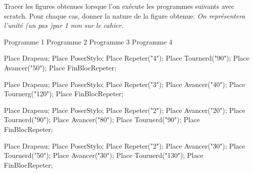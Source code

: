 \begin{Maquette}[Fiche,CorrigeFin,Colonnes=2]{}
   
   \begin{exercice}[Dur] %
      Tracer les figures obtenues lorsque l'on exécute les programmes suivants avec scratch. Pour chaque cas, donner la nature de la figure obtenue. {\it On représentera l'unité (un pas )par 1 mm sur le cahier.} \par \smallskip
      \small Programme 1 \hspace*{2.05cm} Programme 2 \hspace*{2.05cm} Programme 3 \hspace*{2.05cm} Programme 4 \par \smallskip
      \begin{Scratch}[Echelle=0.75]
         Place Drapeau;
         Place PoserStylo;
         Place Repeter("4");
            Place Tournerd("90");
            Place Avancer("50");
         Place FinBlocRepeter;
      \end{Scratch}
      \quad
      \begin{Scratch}[Echelle=0.75]
         Place Drapeau;
         Place PoserStylo;
         Place Repeter("3");
            Place Avancer("40");
            Place Tournerg("120");
         Place FinBlocRepeter;
      \end{Scratch}
      \quad
      \begin{Scratch}[Echelle=0.75]
         Place Drapeau;
         Place PoserStylo;
         Place Repeter("2");
            Place Avancer("20");
            Place Tournerd("90");
            Place Avancer("80");
            Place Tournerd("90");
         Place FinBlocRepeter;
      \end{Scratch} 
      \quad
      \begin{Scratch}[Echelle=0.75]
         Place Drapeau;
         Place PoserStylo;
         Place Repeter("2");
            Place Avancer("30");
            Place Tournerd("50");
            Place Avancer("30");
            Place Tournerd("130");
         Place FinBlocRepeter;
      \end{Scratch}
   \end{exercice}


\end{Maquette}
